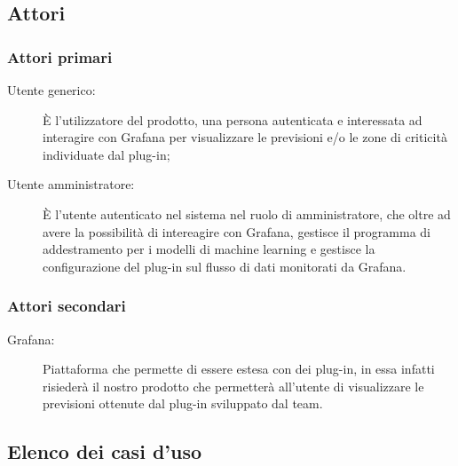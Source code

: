 \documentclass[../analisi-dei-requisiti.tex]{subfiles}
\begin{document}
\subsection{Attori}
\label{subs:attori}

\subsubsection{Attori primari}
\label{sssec:attori_primari}
\begin{description}
  \item[Utente generico:] È l'utilizzatore del prodotto, una persona autenticata e interessata ad interagire con Grafana per visualizzare le previsioni e/o le zone di criticità individuate dal plug-in;
  \item[Utente amministratore:] È l'utente autenticato nel sistema nel ruolo di amministratore, che oltre ad avere la possibilità di intereagire con Grafana, gestisce il programma di addestramento per i modelli di machine learning e gestisce la configurazione del plug-in sul flusso di dati monitorati da Grafana.
\end{description}

\subsubsection{Attori secondari}
\label{sssec:attori_secondari}
\begin{description}
  \item[Grafana:] Piattaforma che permette di essere estesa con dei plug-in, in essa infatti risiederà il nostro prodotto che permetterà all'utente di visualizzare le previsioni ottenute dal plug-in sviluppato dal team.
\end{description}

\subsection{Elenco dei casi d'uso}
\label{subs:elenco_dei_casi_duso}








\end{document}
